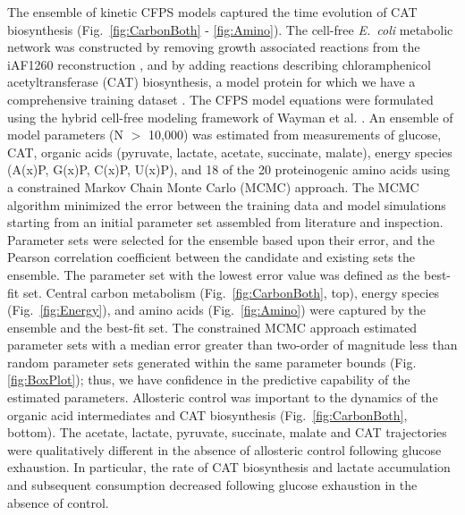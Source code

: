 \documentclass[12pt]{article}
\begin{document}
The ensemble of kinetic CFPS models captured the time evolution of CAT biosynthesis (Fig.~\ref{fig:CarbonBoth} - \ref{fig:Amino}).
The cell-free \textit{E.~coli} metabolic network was constructed by removing growth associated reactions from the iAF1260 reconstruction \cite{Feist:2007aa},
and by adding reactions describing chloramphenicol acetyltransferase (CAT) biosynthesis, a model protein for which we have a comprehensive training dataset \cite{2005_calhoun_BiotechnologyProgress}.
The CFPS model equations were formulated using the hybrid cell-free modeling framework of Wayman et al. \cite{pr3010138}.
An ensemble of model parameters (N $>$ 10,000) was estimated from measurements of glucose, CAT, organic acids (pyruvate, lactate, acetate, succinate, malate), energy species (A(x)P, G(x)P, C(x)P, U(x)P), and 18 of the 20 proteinogenic amino acids using a constrained Markov Chain Monte Carlo (MCMC) approach.
The MCMC algorithm minimized the error between the training data and model simulations starting from an initial parameter set assembled from literature and inspection.
Parameter sets were selected for the ensemble based upon their error, and the Pearson correlation coefficient between the candidate and existing sets the ensemble.
The parameter set with the lowest error value was defined as the best-fit set.
Central carbon metabolism (Fig.~\ref{fig:CarbonBoth}, top), energy species (Fig.~\ref{fig:Energy}), and amino acids (Fig.~\ref{fig:Amino}) were captured by the ensemble and the best-fit set.
The constrained MCMC approach estimated parameter sets with a median error greater than two-order of magnitude less than random parameter sets generated within
the same parameter bounds (Fig. \ref{fig:BoxPlot}); thus, we have confidence in the predictive capability of the estimated parameters.
Allosteric control was important to the dynamics of the organic acid intermediates and CAT biosynthesis (Fig.~\ref{fig:CarbonBoth}, bottom).
The acetate, lactate, pyruvate, succinate, malate and CAT trajectories were qualitatively different in the absence of allosteric control following glucose exhaustion.
In particular, the rate of CAT biosynthesis and lactate accumulation and subsequent consumption decreased following glucose exhaustion in the absence of control.
\end{document}

